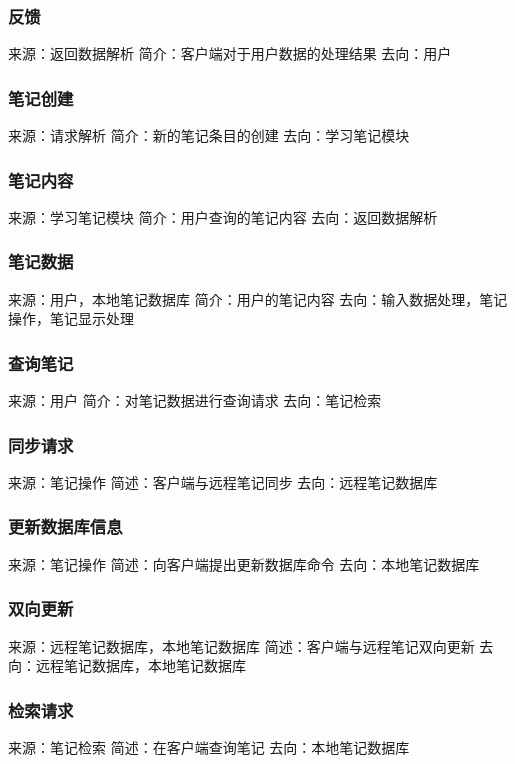 \subsubsection{反馈}
来源：返回数据解析
简介：客户端对于用户数据的处理结果
去向：用户

\subsubsection{笔记创建}
来源：请求解析
简介：新的笔记条目的创建
去向：学习笔记模块

\subsubsection{笔记内容}
来源：学习笔记模块
简介：用户查询的笔记内容
去向：返回数据解析




\subsubsection{笔记数据}
来源：用户，本地笔记数据库
简介：用户的笔记内容
去向：输入数据处理，笔记操作，笔记显示处理

\subsubsection{查询笔记}
来源：用户
简介：对笔记数据进行查询请求
去向：笔记检索

\subsubsection{同步请求}
来源：笔记操作
简述：客户端与远程笔记同步
去向：远程笔记数据库

\subsubsection{更新数据库信息}
来源：笔记操作
简述：向客户端提出更新数据库命令
去向：本地笔记数据库

\subsubsection{双向更新}
来源：远程笔记数据库，本地笔记数据库
简述：客户端与远程笔记双向更新
去向：远程笔记数据库，本地笔记数据库

\subsubsection{检索请求}
来源：笔记检索
简述：在客户端查询笔记
去向：本地笔记数据库

